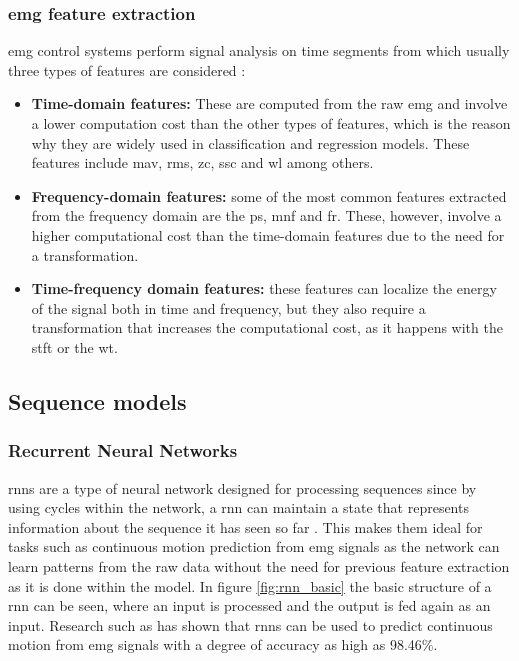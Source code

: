 \subsubsection{\acrshort{emg} feature extraction}

\acrshort{emg} control systems perform signal analysis on time segments from which usually three types of features are considered \cite{EMGprediction}:
\begin{itemize}
    \item \textbf{Time-domain features:} These are computed from the raw \acrshort{emg} and involve a lower computation cost than the other types of features,
    which is the reason why they are widely used in classification and regression models. These features include \acrfull{mav}, \acrfull{rms}, \acrfull{zc}, \acrfull{ssc} and \acrfull{wl}
    among others.
    \item \textbf{Frequency-domain features:} some of the most common features extracted from the frequency domain are the \acrfull{ps}, \acrfull{mnf} and \acrfull{fr}.
    These, however, involve a higher computational cost than the time-domain features due to the need for a transformation.
    \item \textbf{Time-frequency domain features:} these features can localize the energy of the signal both in time and frequency, but they also
    require a transformation that increases the computational cost, as it happens with the \acrfull{stft} or the \acrfull{wt}.
\end{itemize}


\subsection{Sequence models}

\subsubsection{Recurrent Neural Networks}
\acp{rnn} are a type of neural network designed for processing sequences since by using cycles within the network, a \acrshort{rnn} can maintain a state that
represents information about the sequence it has seen so far \cite{RNNdef}. This makes them ideal for tasks such as continuous motion prediction from \acrshort{emg} signals
as the network can learn patterns from the raw data without the need for previous feature extraction as it is done within the model.
In figure \ref{fig:rnn_basic} the basic structure of a \acrshort{rnn} can be seen, where an input is processed and the output is fed again as an input.
Research such as \cite{RNNEMG} has shown that \acp{rnn} can be used to predict continuous motion from \acrshort{emg} signals with a degree of 
accuracy as high as 98.46\%.

